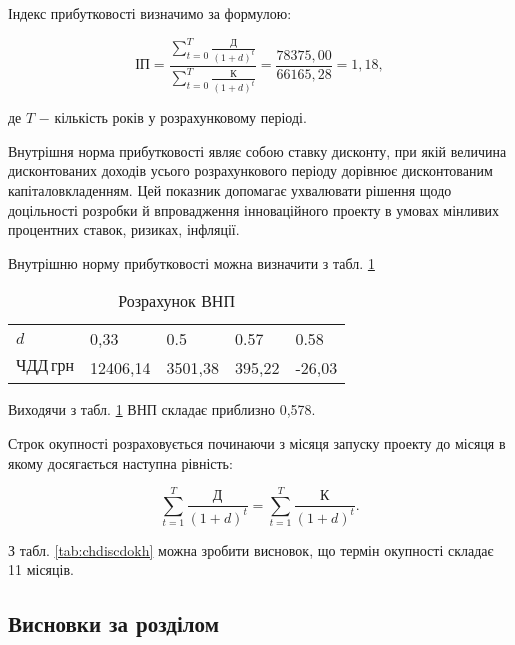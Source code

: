 Індекс прибутковості визначимо за формулою:

\begin{equation}\label{eq:economy15}
	\text{ІП} = \frac{\sum_{t=0}^{T}\frac{\text{Д}}{(1 + d)^{t}}}{\sum_{t=0}^{T}\frac{\text{К}}{(1 + d)^{t}}} = \frac{78375,00}{66165,28} = 1,18,
\end{equation}

\noindent де $T$ $-$ кількість років у розрахунковому періоді.

\vspace{1.5em}

Внутрішня норма прибутковості являє собою ставку дисконту, при якій величина дисконтованих доходів усього розрахункового періоду дорівнює дисконтованим капіталовкладенням. Цей показник допомагає ухвалювати рішення щодо доцільності розробки й впровадження інноваційного проекту в умовах мінливих процентних ставок, ризиках, інфляції.

Внутрішню норму прибутковості можна визначити з табл. \ref{tab:vnp}

\begin{table}[h!]
	\captionstyle{ \raggedright}
	\caption{Розрахунок ВНП}\label{tab:vnp}
	\begin{tabular}{| p{} | p{} | p{} | p{} | p{} |}
		\hline
		$d$ & 0,33 & 0.5 & 0.57 & 0.58 \\
		\hlinewd{2pt}
		$\text{ЧДД} \, \text{грн}$ & 12406,14 & 3501,38 & 395,22 & -26,03 \\
		\hline
	\end{tabular}
\end{table}

Виходячи з табл. \ref{tab:vnp} ВНП складає приблизно 0,578.

Строк окупності розраховується починаючи з місяця запуску проекту до місяця в якому досягається наступна рівність:

\begin{equation}\label{eq:economy16}
	\sum_{t=1}^{T}\frac{\text{Д}}{(1 + d)^{t}} = \sum_{t=1}^{T}\frac{\text{К}}{(1 + d)^{t}}.
\end{equation}

\vspace{1.5em}

З табл. \ref{tab:chdiscdokh} можна зробити висновок, що термін окупності складає 11 місяців.

\subsection{Висновки за розділом}


